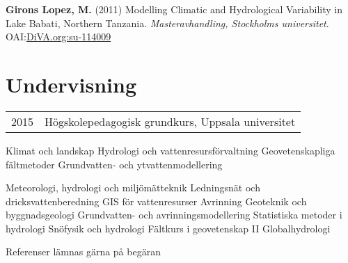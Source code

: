 \documentclass[]{gironslopez-resume-se}
\begin{document}
    \sectionsep
    
    \textbf{Girons Lopez, M.} (2011) Modelling Climatic and Hydrological Variability in Lake Babati, Northern Tanzania. \textit{Masteravhandling, Stockholms universitet}. OAI:\href{http://www.diva-portal.org/smash/record.jsf?pid=diva2\%3A788849\&dswid=\_new}{DiVA.org:su-114009}

    \sectionsep

    \section{Undervisning}

    \begin{tabular}{ll}
      2015 & Högskolepedagogisk grundkurs, Uppsala universitet
    \end{tabular}

    \sectionsep
    
    Klimat och landskap \textbullet{} Hydrologi och vattenresursförvaltning \textbullet{} Geovetenskapliga fältmetoder \textbullet{} Grundvatten- och ytvattenmodellering
    
    \sectionsep
    
    Meteorologi, hydrologi och miljömätteknik \textbullet{} Ledningsnät och dricksvattenberedning \textbullet{} GIS för vattenresurser \textbullet{} Avrinning \textbullet{} Geoteknik och byggnadsgeologi \textbullet{} Grundvatten- och avrinningsmodellering \textbullet{} Statistiska metoder i hydrologi \textbullet{} Snöfysik och hydrologi \textbullet{} Fältkurs i geovetenskap II \textbullet{} Globalhydrologi

  \vfill
  
  Referenser lämnas gärna på begäran
\end{document}
